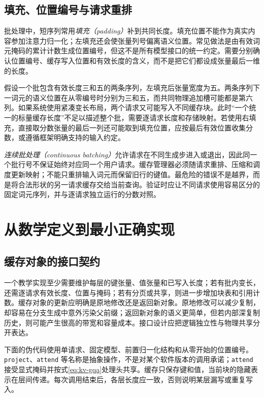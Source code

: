 \documentclass[UTF8,12pt,a4paper,fontset=fandol]{ctexart}
\begin{document}
\subsection{填充、位置编号与请求重排}

批处理中，短序列常用\emph{填充（padding）}补到共同长度。填充位置不能作为真实内容参加注意力归一化；左填充还会使张量列号偏离语义位置。常见做法是由有效词元掩码的累计计数生成位置编号，但这不是所有模型接口的统一约定。需要分别确认位置编号、缓存写入位置和有效长度的含义，而不是把它们都设成张量最后一维的长度。

假设一个批包含有效长度三和五的两条序列，左填充后张量宽度为五。两条序列下一词元的语义位置在从零编号时分别为三和五，而共同物理追加槽可能都是第六列。如果系统使用紧凑变长布局，两个请求又可能写入不同缓存块。此时“一个统一的标量缓存长度”不足以描述整个批，需要逐请求长度和存储映射。若使用右填充，直接取分数张量的最后一列还可能取到填充位置，应按最后有效位置收集分数，或遵循框架明确支持的输入约定。

\emph{连续批处理（continuous batching）}允许请求在不同生成步进入或退出，因此同一个批行号不保证始终对应同一个用户请求。缓存管理器必须随请求重排、压缩和调度更新映射；不能只重排输入词元而保留旧行的键值。最危险的错误不是越界，而是将合法形状的另一请求缓存交给当前查询。验证时应让不同请求使用容易区分的固定词元序列，并与逐请求独立运行的分数对照。

\section{从数学定义到最小正确实现}
\label{sec:kv-implementation}

\subsection{缓存对象的接口契约}

一个教学实现至少需要维护每层的键张量、值张量和已写入长度；若有批内变长，还需逐请求有效长度、位置与掩码；若有分页或共享，则进一步增加块表和引用计数。缓存对象的更新应明确是原地修改还是返回新对象。原地修改可以减少复制，却容易在分支生成中意外污染父前缀；返回新对象的语义更简单，但若内部深复制历史，则可能产生很高的带宽和容量成本。接口设计应把逻辑独立性与物理共享分开表达。

下面的伪代码使用单请求、固定模型、前置归一化结构和从零开始的位置编号。\texttt{project}、\texttt{attend} 等名称是抽象操作，不是对某个软件版本的调用承诺；\texttt{attend} 接受显式掩码并按式\eqref{eq:kv-gqa}处理头共享。缓存只保存键和值，当前块的隐藏表示在层间传递。每次调用结束后，各层长度应一致，否则说明某层漏写或重复写入。
\end{document}
